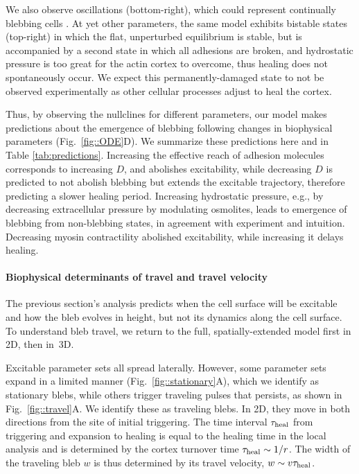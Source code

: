 We also observe oscillations (bottom-right), which could represent continually blebbing cells \cite{Charras:2008ic}. At yet other parameters, the same model exhibits bistable states (top-right) in which the flat, unperturbed equilibrium is stable, but is accompanied by a second state in which all adhesions are broken, and hydrostatic pressure is too great for the actin cortex to overcome, thus healing does not spontaneously occur. We expect this permanently-damaged state to not be observed experimentally as other cellular processes adjust to heal the cortex.  

Thus, by observing the nullclines  for different parameters, our model makes predictions about the emergence of blebbing following changes in biophysical parameters (Fig.~\ref{fig::ODE}D). We summarize these predictions here and in {Table \ref{tab:predictions}}. Increasing the effective reach of adhesion molecules corresponds to increasing $D$, and abolishes excitability, while decreasing $D$ is predicted to not abolish blebbing but extends the excitable trajectory, therefore predicting a slower healing period. Increasing hydrostatic pressure, e.g., by decreasing extracellular pressure by modulating osmolites, leads to emergence of blebbing from non-blebbing states, in agreement with experiment \cite{Tinevez:2009bh} and intuition. Decreasing myosin contractility abolished excitability, while increasing it delays healing. 


\paragraph{Biophysical determinants of travel and travel velocity}

The previous section's analysis predicts when the cell surface will be excitable and how the bleb evolves in height, but not its dynamics along the cell surface. To understand bleb travel, we return to the full, spatially-extended model first in 2D, then in~3D. 

Excitable parameter sets all spread laterally. However, some parameter sets expand in a limited manner (Fig.~\ref{fig::stationary}A), which we identify as stationary blebs, while others trigger traveling pulses that persists, as shown in Fig.~\ref{fig::travel}A. We identify these as traveling blebs. In 2D, they move in both directions from the site of initial triggering. The time interval $\tau_{\mbox{\scriptsize heal}}$ from triggering and expansion to healing is equal to the healing time in the local analysis and is determined by the cortex turnover time $\tau_{\mbox{\scriptsize heal}} \sim 1/r$. The width of the traveling bleb $w$ is thus determined by its travel velocity, $w\sim v\tau_{\mbox{\scriptsize heal}}$. 

